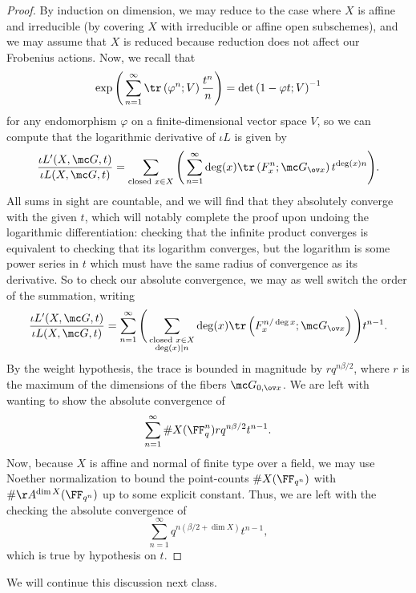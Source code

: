 \documentclass[../notes.tex]{subfiles}
\begin{document}
\begin{proof}
	By induction on dimension, we may reduce to the case where $X$ is affine and irreducible (by covering $X$ with irreducible or affine open subschemes), and we may assume that $X$ is reduced because reduction does not affect our Frobenius actions. Now, we recall that
	\[\exp\Bigg(\sum_{n=1}^\infty\tr\left(\varphi^n;V\right)\frac{t^n}n\Bigg)=\det\left(1-\varphi t;V\right)^{-1}\]
	for any endomorphism $\varphi$ on a finite-dimensional vector space $V$, so we can compute that the logarithmic derivative of $\iota L$ is given by
	\[\frac{\iota L'(X,\mc G,t)}{\iota L(X,\mc G,t)}=\sum_{\text{closed }x\in X}\Bigg(\sum_{n=1}^\infty\deg(x)\tr\left( F_x^n;\mc G_{\ov x}\right)t^{\deg(x)n}\Bigg).\]
	All sums in sight are countable, and we will find that they absolutely converge with the given $t$, which will notably complete the proof upon undoing the logarithmic differentiation: checking that the infinite product converges is equivalent to checking that its logarithm converges, but the logarithm is some power series in $t$ which must have the same radius of convergence as its derivative. So to check our absolute convergence, we may as well switch the order of the summation, writing
	\[\frac{\iota L'(X,\mc G,t)}{\iota L(X,\mc G,t)}=\sum_{n=1}^\infty\Bigg(\sum_{\substack{\text{closed }x\in X\\\deg(x)\mid n}}\deg(x)\tr\left(F_x^{n/\deg x};\mc G_{\ov x}\right)\Bigg)t^{n-1}.\]
	By the weight hypothesis, the trace is bounded in magnitude by $rq^{n\beta/2}$, where $r$ is the maximum of the dimensions of the fibers $\mc G_{0,\ov x}$. We are left with wanting to show the absolute convergence of
	\[\sum_{n=1}^\infty\#X(\FF_q^n)rq^{n\beta/2}t^{n-1}.\]
	Now, because $X$ is affine and normal of finite type over a field, we may use Noether normalization to bound the point-counts $\#X(\FF_{q^n})$ with $\#\AA^{\dim X}(\FF_{q^n})$ up to some explicit constant. Thus, we are left with the checking the absolute convergence of
	\[\sum_{n=1}^\infty q^{n(\beta/2+\dim X)}t^{n-1},\]
	which is true by hypothesis on $t$.
\end{proof}
We will continue this discussion next class.
\end{document}
